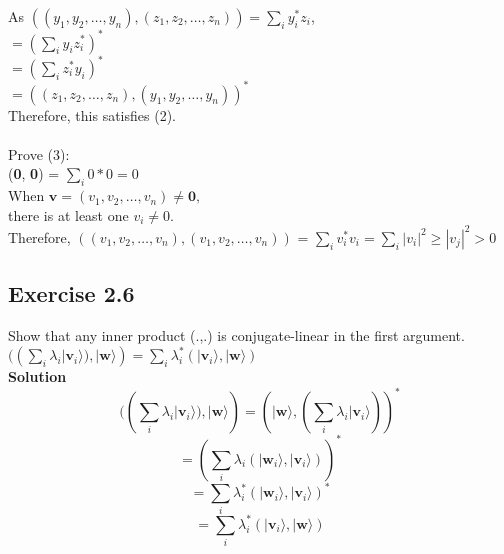 \documentclass{article}
\begin{document}
As $((y_1, y_2, \ldots, y_n), (z_1, z_2, \ldots, z_n)) = \sum_{i} y_i^* z_i$, \\
$ = (\sum_{i} y_i z_i^*)^*$ \\
$ = (\sum_{i} z_i^* y_i)^*$ \\
$ = ((z_1, z_2, \ldots, z_n), (y_1, y_2, \ldots, y_n))^*$ \\
Therefore, this satisfies (2). \\ \\
Prove (3): \\
 (\textbf{0}, \textbf{0}) = $\sum_i 0 * 0 = 0$ \\
 When $\textbf{v} = (v_1, v_2, \ldots, v_n) \neq \textbf{0},$ \\
 there is at least one $v_i \neq 0$. \\
 Therefore, $((v_1, v_2, \ldots, v_n), (v_1, v_2, \ldots, v_n))$ 
 = 
    $\sum_i v_i^* v_i = \sum_i |v_i|^2 \geq |v_j|^2 > 0$ \\
\subsection{Exercise 2.6}
Show that any inner product (.,.) is conjugate-linear in the first argument. \\
$((\sum_i \lambda_i |\mathbf{v}_i\rangle), |\mathbf{w}\rangle) = \sum_i \lambda_i^* (|\mathbf{v}_i\rangle, |\mathbf{w}\rangle)$ \\

\textbf{Solution} \\
\begin{equation}
    ((\sum_i \lambda_i |\mathbf{v}_i\rangle), |\mathbf{w}\rangle) = (|\mathbf{w}\rangle, (\sum_i \lambda_i |\mathbf{v}_i\rangle))^*
\end{equation}
\begin{equation}
    = (\sum_i \lambda_i (|\mathbf{w}_i\rangle, |\mathbf{v}_i\rangle))^*
\end{equation}
\begin{equation}
    = \sum_i \lambda_i^* (|\mathbf{w}_i\rangle, |\mathbf{v}_i\rangle)^*
\end{equation}
\begin{equation}
    = \sum_i \lambda_i^* (|\mathbf{v}_i\rangle, |\mathbf{w}\rangle)
\end{equation}
\end{document}
